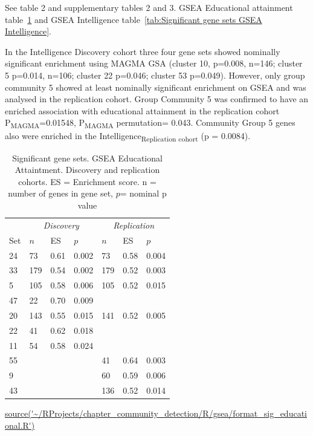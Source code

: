See table 2 and supplementary tables 2 and 3. GSEA Educational attainment table~\ref{tab:Significant gene sets Educational Attaintment} and GSEA Intelligence table~\ref{tab:Significant gene sets GSEA Intelligence}.


In the Intelligence Discovery cohort three four gene sets showed nominally significant enrichment using MAGMA GSA (cluster 10, p=0.008, n=146; cluster 5 p=0.014, n=106; cluster 22 p=0.046; cluster 53 p=0.049). However, only group community 5 showed at least nominally significant enrichment on GSEA and was analysed in the replication cohort. 
Group Community 5 was confirmed to have an enriched association with educational attainment in the replication cohort P\textsubscript{MAGMA}=0.01548, P\textsubscript{MAGMA} permutation= 0.043. Community Group 5 genes also were enriched in the Intelligence\textsubscript{Replication cohort} (p = 0.0084).




\begin{table}[ht!]
\centering
\setlength{\extrarowheight}{2pt}
\begin{tabular}{lllllll}
  \toprule
   &  \multicolumn{3}{c}{\textit{Discovery}} & \multicolumn{3}{c}{\textit{Replication}} \\
   \cmidrule{2-7}
Set & $n$ & ES & $p$ & $n$ & ES & $p$ \\ 
  \midrule
24 & 73 & 0.61 & 0.002 & 73 & 0.58 & 0.004 \\ 
  33 & 179 & 0.54 & 0.002 & 179 & 0.52 & 0.003 \\ 
  5 & 105 & 0.58 & 0.006 & 105 & 0.52 & 0.015 \\ 
  47 & 22 & 0.70 & 0.009 &  &  &  \\ 
  20 & 143 & 0.55 & 0.015 & 141 & 0.52 & 0.005 \\ 
  22 & 41 & 0.62 & 0.018 &  &  &  \\ 
  11 & 54 & 0.58 & 0.024 &  &  &  \\ 
  55 &  &  &  & 41 & 0.64 & 0.003 \\ 
  9 &  &  &  & 60 & 0.59 & 0.006 \\ 
  43 &  &  &  & 136 & 0.52 & 0.014 \\ 
   \bottomrule
\end{tabular}
\caption{Significant gene sets. GSEA Educational Attaintment. Discovery and replication cohorts.  ES = Enrichment score. n = number of genes in gene set, $p$= nominal p value} 
\tiny\url{source('~/RProjects/chapter_community_detection/R/gsea/format_sig_educational.R')}
\label{tab:Significant gene sets Educational Attaintment}
\end{table}

